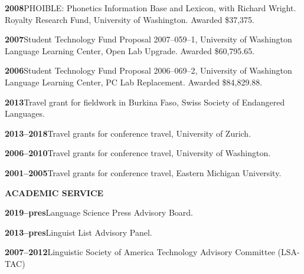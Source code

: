 \documentclass[11pt]{article}
\newcommand{\hangpara}{
 \setlength{\parindent}{0in} %
 \hangindent=0.42in %
}
\begin{document}
\vskip 6pt
\hangpara
{\bf 2008}\hspace{1ex}PHOIBLE: Phonetics Information Base and Lexicon, with Richard Wright. Royalty Research Fund, University of Washington. Awarded \$37,375.

\vskip 6pt
\hangpara
{\bf 2007}\hspace{1ex}Student Technology Fund Proposal 2007--059--1, University of Washington Language Learning Center, Open Lab Upgrade. Awarded \$60,795.65.

\vskip 6pt
\hangpara
{\bf 2006}\hspace{1ex}Student Technology Fund Proposal 2006--069--2, University of Washington Language Learning Center, PC Lab Replacement. Awarded \$84,829.88.

\vskip 6pt
\hangpara
{\bf 2013}\hspace{1ex}Travel grant for fieldwork in Burkina Faso, Swiss Society of Endangered Languages.

\vskip 6pt
\hangpara
{\bf 2013--2018}\hspace{1ex}Travel grants for conference travel, University of Zurich.

\vskip 6pt
\hangpara
{\bf 2006--2010}\hspace{1ex}Travel grants for conference travel, University of Washington.

\vskip 6pt
\hangpara
{\bf 2001--2005}\hspace{1ex}Travel grants for conference travel, Eastern Michigan University.



\vskip 20pt
\begin{flushleft}
{\bf ACADEMIC SERVICE}
\end{flushleft}



\hangpara
{\bf 2019--pres}\hspace{1ex}Language Science Press Advisory Board.

\vskip 6pt
\hangpara
{\bf 2013--pres}\hspace{1ex}Linguist List Advisory Panel.

\vskip 6pt
\hangpara
{\bf 2007--2012}\hspace{1ex}Linguistic Society of America Technology Advisory Committee (LSA-TAC)
\end{document}
